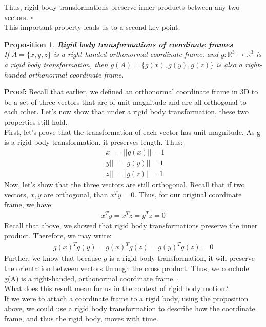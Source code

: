 \documentclass[oneside]{book}
\newtheorem{proposition}{Proposition}
\newenvironment{prop} %
  {\colorlet{shadecolor}{blue!9}\begin{shaded}\begin{proposition}}
  {\end{proposition}\end{shaded}}
\begin{document}
Thus, rigid body transformations preserve inner products between any two vectors. $\square$\\
This important property leads us to a second key point.
\begin{prop}
\textbf{Rigid body transformations of coordinate frames}\\
If $A = \{x, y, z\}$ is a right-handed orthonormal coordinate frame, and $g: \mathbb{R}^3 \to \mathbb{R}^3$ is a rigid body transformation, then $g(A) =\{g(x), g(y), g(z)\} $ is also a right-handed orthonormal coordinate frame.
\end{prop}\noindent
\textbf{Proof:} Recall that earlier, we defined an orthonormal coordinate frame in 3D to be a set of three vectors that are of unit magnitude and are all orthogonal to each other. Let's now show that under a rigid body transformation, these two properties still hold.\\
First, let's prove that the transformation of each vector has unit magnitude. As g is a rigid body transformation, it preserves length. Thus:
\begin{align}
    ||x||  = ||g(x)|| = 1\\
    ||y||  = ||g(y)|| = 1\\
    ||z||  = ||g(z)|| = 1
\end{align}
Now, let's show that the three vectors are still orthogonal. Recall that if two vectors, $x, y$ are orthogonal, than $x^Ty = 0$. Thus, for our original coordinate frame, we have:
\begin{align}
    x^Ty = x^Tz = y^Tz = 0
\end{align}
Recall that above, we showed that rigid body transformations preserve the inner product. Therefore, we may write:
\begin{align}
    g(x)^Tg(y) = g(x)^Tg(z) = g(y)^Tg(z) = 0
\end{align}
Further, we know that because $g$ is a rigid body transformation, it will preserve the orientation between vectors through the cross product. Thus, we conclude g(A) is a right-handed, orthonormal coordinate frame. $\square$\\
What does this result mean for us in the context of rigid body motion?\\
If we were to attach a coordinate frame to a rigid body, using the proposition above, we could use a rigid body transformation to describe how the coordinate frame, and thus the rigid body, moves with time.
\end{document}
